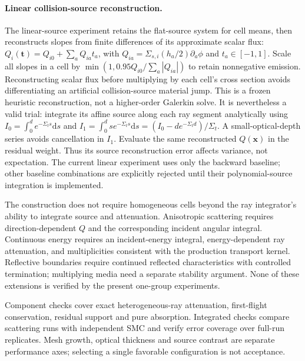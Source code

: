 \documentclass[11pt]{article}
\begin{document}
\paragraph{Linear collision-source reconstruction.}
The linear-source experiment retains the flat-source system for cell means,
then reconstructs slopes from finite differences of its approximate scalar flux:
$Q_i(\mathbf t)=Q_{i0}+\sum_a Q_{ia}t_a$, with
$Q_{ia}=\Sigma_{s,i}(h_a/2)\partial_a\phi$ and $t_a\in[-1,1]$.
Scale all slopes in a cell by
$\min(1,0.95Q_{i0}/\sum_a|Q_{ia}|)$ to retain nonnegative emission.
Reconstructing scalar flux before multiplying by each cell's cross section
avoids differentiating an artificial collision-source material jump.
This is a frozen heuristic reconstruction, not a higher-order Galerkin solve.
It is nevertheless a valid trial: integrate its affine source along each ray
segment analytically using $I_0=\int_0^d e^{-\Sigma_t s}\mathrm ds$ and
$I_1=\int_0^d s e^{-\Sigma_t s}\mathrm ds=(I_0-de^{-\Sigma_t d})/\Sigma_t$.
A small-optical-depth series avoids cancellation in $I_1$.
Evaluate the same reconstructed $Q(\mathbf x)$ in the residual weight. Thus its
source reconstruction error affects variance, not expectation. The current
linear experiment uses only the backward baseline; other baseline combinations
are explicitly rejected until their polynomial-source integration is implemented.

The construction does not require homogeneous cells beyond the ray integrator's
ability to integrate source and attenuation. Anisotropic scattering requires
direction-dependent $Q$ and the corresponding incident angular integral.
Continuous energy requires an incident-energy integral, energy-dependent ray
attenuation, and multiplicities consistent with the production transport kernel.
Reflective boundaries require continued reflected characteristics with controlled
termination; multiplying media need a separate stability argument. None of these
extensions is verified by the present one-group experiments.

Component checks cover exact heterogeneous-ray attenuation, first-flight
conservation, residual support and pure absorption. Integrated checks compare
scattering runs with independent SMC and verify error coverage over full-run
replicates. Mesh growth, optical thickness and source contrast are separate
performance axes; selecting a single favorable configuration is not acceptance.
\end{document}
